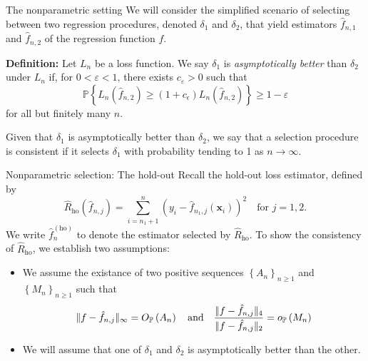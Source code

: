 \documentclass{beamer}
\newcommand{\0}{\emptyset}
\newcommand{\prob}{\mathbb{P}}
\newcommand{\paren}[1]{\left(#1 \right)}
\newcommand{\set}[1]{\left\{ #1 \right\}}
\newcommand{\norm}[1]{|\hspace{-1pt}|#1 |\hspace{-1pt}|}
\newcommand{\x}{\boldsymbol{x}}
\newcommand{\Loss}[1]{L_{n}\paren{#1}}
\newcommand{\ho}{\hat{R}_{\mathrm{ho}}}
\newcommand{\op}[1]{o_{\prob}\paren{#1}}
\newcommand{\Op}[1]{O_{\prob}\paren{#1}}
\newcommand{\fhat}[2]{\hat{f}_{#1, #2}}
\newcommand{\fho}{\hat{f}^{(\mathrm{ho})}_{n}}
\newcommand{\1}{\mathmybb{1}}
\begin{document}
\begin{frame}{The nonparametric setting}
  We will consider the simplified scenario of selecting between two regression procedures, denoted \alert{\(\delta_{1}\)} and \alert{\(\delta_{2}\)}, that yield estimators \alert{\(\hat{f}_{n, 1}\)} and \alert{\(\hat{f}_{n, 2}\)} of the regression function \(f\).

  \textbf{Definition:}
  Let \(L_{n}\) be a loss function. We say \(\delta_{1}\) is \alert{\emph{asymptotically better}} than \(\delta_{2}\) under \(L_{n}\) if, for \(0<\varepsilon<1\), there exists \(c_{\varepsilon}>0\) such that
  \[\prob\set{\Loss{\fhat{n}{2}}\geq (1+c_{\epsilon})\Loss{\fhat{n}{2}} }\geq 1-\varepsilon\]
  for all but finitely many \(n\).

  Given that \(\delta_{1}\) is asymptotically better than \(\delta_{2}\), we say that a selection procedure is \alert{consistent} if it selects \(\delta_{1}\) with probability tending to 1 as \(n\to\infty\).
\end{frame}


\begin{frame}{Nonparametric selection: The hold-out}
    Recall the \alert{hold-out} loss estimator, defined by
  \begin{equation}\label{def:holoss}
      \ho(\fhat{n}{j}) = \sum_{i=n_{1}+1}^{n}\paren{y_{i} - \fhat{n_{1}}{j}(\x_{i})}^{2}\quad\text{for }j=1,2.
  \end{equation}
  We write \(\fho\) to denote the estimator selected by \(\ho\).
  To show the consistency of \(\ho\), we establish two assumptions:  
  \begin{itemize}
    \item We assume the existance of two positive sequences \(\set{A_{n}}_{n\geq1}\) and \(\set{M_{n}}_{n\geq1}\) such that 
    \begin{equation}\label{eq:lpconditions}
      \norm{f-\fhat{n}{j}}_{\infty} = \Op{A_{n}}\quad\text{and}\quad\frac{\norm{f-\fhat{n}{j}}_{4}}{\norm{f-\fhat{n}{j}}_{2}} = \op{M_{n}}
    \end{equation}
    \item We will assume that one of \(\delta_{1}\) and \(\delta_{2}\) is asymptotically better than the other.
    
  \end{itemize}
\end{frame}
\end{document}
